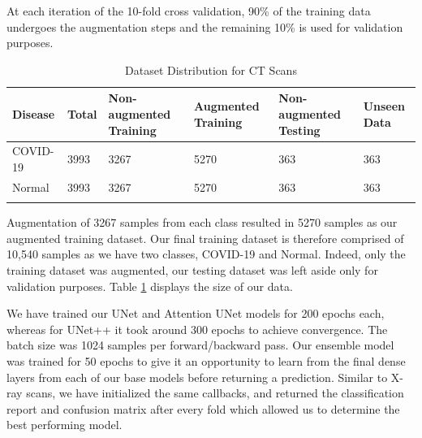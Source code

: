 At each iteration of the 10-fold cross validation, 90\% of the training data undergoes the augmentation steps and the remaining 10\% is used for validation purposes.

\begin{longtable}{| p{} | p{} | p{} | p{} | p{} | p{} |} 

    \hline
\textbf{Disease} & \textbf{Total}    & \textbf{Non-augmented Training}   &\textbf{Augmented Training} &\textbf{Non-augmented Testing} & \textbf{Unseen Data} \\
\hline
			COVID-19    &3993   &3267    &5270   &363   &363
\\\hline
			Normal      &3993   &3267    &5270   &363   &363
\\\hline 

\caption{Dataset Distribution for CT Scans}

  \label{tab:CT Dataset Info}
    \end{longtable}
\vspace{-1em}

Augmentation of 3267 samples from each class resulted in 5270 samples as our augmented training dataset. Our final training dataset is therefore comprised of 10,540 samples as we have two classes, COVID-19 and Normal. Indeed, only the training dataset was augmented, our testing dataset was left aside only for validation purposes. Table \ref{tab:CT Dataset Info} displays the size of our data.

We have trained our UNet and Attention UNet models for 200 epochs each, whereas for UNet++ it took around 300 epochs to achieve convergence. The batch size was 1024 samples per forward/backward pass. Our ensemble model was trained for 50 epochs to give it an opportunity to learn from the final dense layers from each of our base models before returning a prediction. Similar to X-ray scans, we have initialized the same callbacks, and returned the classification report \cite{SCR} and confusion matrix \cite{SCM} after every fold which allowed us to determine the best performing model.



